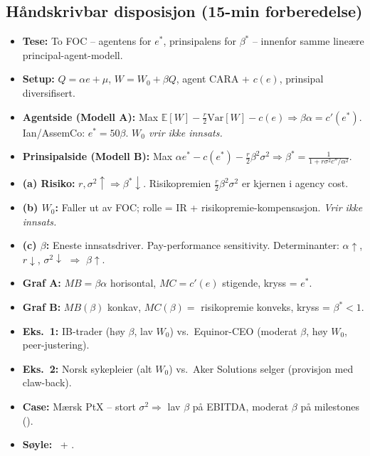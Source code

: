 \subsection*{Håndskrivbar disposisjon (15-min forberedelse)}
\begin{itemize}\setlength{\itemsep}{2pt}
\item \textbf{Tese:} To FOC -- agentens for $e^{*}$, prinsipalens for $\beta^{*}$ -- innenfor samme lineære principal-agent-modell.
\item \textbf{Setup:} $Q=\alpha e+\mu$, $W=W_0+\beta Q$, agent CARA + $c(e)$, prinsipal diversifisert.
\item \textbf{Agentside (Modell A):} Max $\mathbb{E}[W]-\tfrac{r}{2}\mathrm{Var}[W]-c(e)\Rightarrow \beta\alpha=c'(e^{*})$. Ian/AssemCo: $e^{*}=50\beta$. \emph{$W_0$ vrir ikke innsats.}
\item \textbf{Prinsipalside (Modell B):} Max $\alpha e^{*}-c(e^{*})-\tfrac{r}{2}\beta^{2}\sigma^{2}\Rightarrow \beta^{*}=\tfrac{1}{1+r\sigma^{2}c''/\alpha^{2}}$.
\item \textbf{(a) Risiko:} $r,\sigma^{2}\uparrow\Rightarrow\beta^{*}\downarrow$. Risikopremien $\tfrac{r}{2}\beta^{2}\sigma^{2}$ er kjernen i agency cost.
\item \textbf{(b) $W_0$:} Faller ut av FOC; rolle = IR + risikopremie-kompensasjon. \emph{Vrir ikke innsats.}
\item \textbf{(c) $\beta$:} Eneste innsatsdriver. Pay-performance sensitivity. Determinanter: $\alpha\uparrow$, $r\downarrow$, $\sigma^{2}\downarrow$ $\Rightarrow$ $\beta\uparrow$.
\item \textbf{Graf A:} $MB=\beta\alpha$ horisontal, $MC=c'(e)$ stigende, kryss = $e^{*}$.
\item \textbf{Graf B:} $MB(\beta)$ konkav, $MC(\beta)=$ risikopremie konveks, kryss = $\beta^{*}<1$.
\item \textbf{Eks.\ 1:} IB-trader (høy $\beta$, lav $W_0$) vs.\ Equinor-CEO (moderat $\beta$, høy $W_0$, peer-justering).
\item \textbf{Eks.\ 2:} Norsk sykepleier (alt $W_0$) vs.\ Aker Solutions selger (provisjon med claw-back).
\item \textbf{Case:} Mærsk PtX -- stort $\sigma^{2}\Rightarrow$ lav $\beta$ på EBITDA, moderat $\beta$ på milestones ().
\item \textbf{Søyle:} \STwo\ + \SThree.
\end{itemize}
